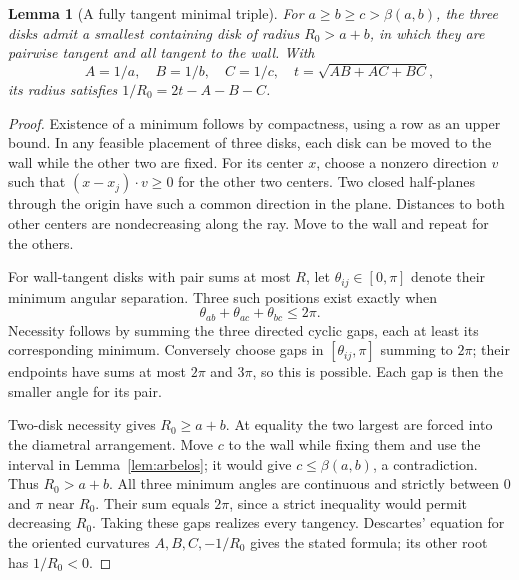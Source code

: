 \documentclass[11pt]{article}
\newtheorem{lemma}[theorem]{Lemma}
\theoremstyle{remark}
\newcommand{\bp}{\beta}
\begin{document}
\begin{lemma}[A fully tangent minimal triple]\label{lem:minimal}
For $a\ge b\ge c>\bp(a,b)$, the three disks admit a smallest
containing disk of radius $R_0>a+b$, in which they are pairwise tangent
and all tangent to the wall. With
\[
 A=1/a,\quad B=1/b,\quad C=1/c,\quad t=\sqrt{AB+AC+BC},
\]
its radius satisfies $1/R_0=2t-A-B-C$.
\end{lemma}
\begin{proof}
Existence of a minimum follows by compactness, using a row as an upper
bound. In any feasible placement of three disks, each disk can be moved
to the wall while the other two are fixed. For its center $x$, choose
a nonzero direction $v$ such that $(x-x_j)\cdot v\ge0$ for the
other two centers. Two closed half-planes through the origin have such
a common direction in the plane. Distances to both other centers are
nondecreasing along the ray. Move to the wall and repeat for the others.

For wall-tangent disks with pair sums at most $R$, let
$\theta_{ij}\in[0,\pi]$ denote their minimum angular separation.
Three such positions exist exactly when
\[
 \theta_{ab}+\theta_{ac}+\theta_{bc}\le2\pi.
\]
Necessity follows by summing the three directed cyclic gaps, each at
least its corresponding minimum. Conversely choose gaps in
$[\theta_{ij},\pi]$ summing to $2\pi$; their endpoints have sums
at most $2\pi$ and $3\pi$, so this is possible. Each gap is then
the smaller angle for its pair.

Two-disk necessity gives $R_0\ge a+b$. At equality the two largest
are forced into the diametral arrangement. Move $c$ to the wall while
fixing them and use the interval in Lemma~\ref{lem:arbelos}; it would
give $c\le\bp(a,b)$, a contradiction. Thus $R_0>a+b$. All three
minimum angles are continuous and strictly between $0$ and $\pi$
near $R_0$. Their sum equals $2\pi$, since a strict inequality would
permit decreasing $R_0$. Taking these gaps realizes every tangency.
Descartes' equation for the oriented curvatures $A,B,C,-1/R_0$ gives
the stated formula; its other root has $1/R_0<0$.
\end{proof}
\end{document}
